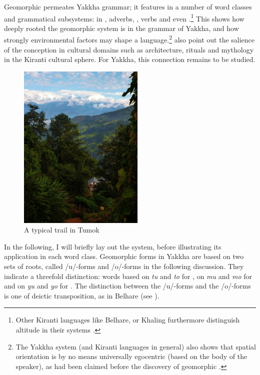 \newpage
Geomorphic  permeates Yakkha grammar;  it features in a number of word classes and grammatical subsystems: in , adverbs, ,  verbs and even .\footnote{Other Kiranti languages like Belhare,  or Khaling furthermore distinguish altitude in their   systems \citep{Ebert1994The-structure, Bickel1997Spatial}.} This shows how deeply rooted the geomorphic system is in the grammar of Yakkha, and how strongly environmental factors may shape a language.\footnote{The Yakkha system (and Kiranti languages in general) also shows that spatial orientation is by no means universally egocentric (based on the body of the speaker), as had been claimed before the discovery of geomorphic .} \citet{Bickeletal1999Cultural} also point out the salience of the  conception in cultural domains such as architecture, rituals and mythology in the Kiranti cultural sphere. For Yakkha, this connection remains to be studied.

\begin{figure}
\centering
\includegraphics[width=6cm]{figures/tumok-path.jpg}
\caption{A typical trail in Tumok}\label{tumok-path}
\end{figure}

In the following, I will briefly lay out the system, before illustrating its application in each word class. Geomorphic forms in Yakkha are based on two sets of roots, called /u/-forms and /o/-forms in the following discussion. They indicate  a threefold distinction: words based on \emph{tu} and \emph{to} for , on \emph{mu} and \emph{mo} for  and on \emph{yu} and \emph{yo} for . The distinction between the /u/-forms and the /o/-forms is one of deictic transposition, as in Belhare (see \citealt{Bickel1997Spatial, Bickel2001Deictic}). 


